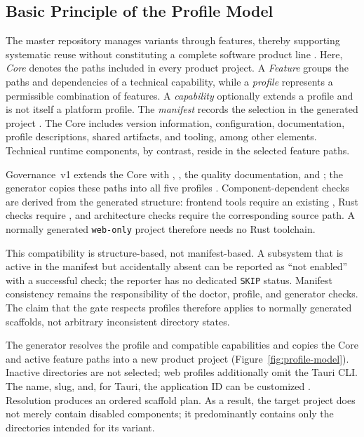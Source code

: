 \subsection{Basic Principle of the Profile Model}
\label{subsec:grundprinzip-profilmodell}

The master repository manages variants through features, thereby supporting
systematic reuse without constituting a complete software product line
\parencite{clements2001software-product-lines,krueger1992software-reuse}.
Here, \emph{Core} denotes the paths included in every product project. A
\emph{Feature} groups the paths and dependencies of a technical capability,
while a \emph{profile} represents a permissible combination of features. A
\emph{capability} optionally extends a profile and is not itself a platform
profile. The \emph{manifest} records the selection in the generated project
\parencite{kleiveist2026profiles,kleiveist2026governance-snapshot}.
The Core includes version information, configuration, documentation, profile
descriptions, shared artifacts, and tooling, among other elements. Technical
runtime components, by contrast, reside in the selected feature paths.

Governance~v1 extends the Core with ,
, the quality documentation, and
; the generator copies these paths into all five profiles
\parencite{kleiveist2026quality-policy}. Component-dependent checks are derived
from the generated structure: frontend tools require an existing
, Rust checks require
, and architecture checks require the corresponding
source path. A normally generated \texttt{web-only} project therefore needs no
Rust toolchain.

This compatibility is structure-based, not manifest-based. A subsystem that
is active in the manifest but accidentally absent can be reported as
\enquote{not enabled} with a successful check; the reporter has no dedicated
\texttt{SKIP} status. Manifest consistency remains the responsibility of the
doctor, profile, and generator checks. The claim that the gate respects
profiles therefore applies to normally generated scaffolds, not arbitrary
inconsistent directory states.



The generator resolves the profile and compatible capabilities and copies the
Core and active feature paths into a new product project
(Figure~\ref{fig:profile-model}). Inactive directories are not selected; web
profiles additionally omit the Tauri CLI. The name, slug, and, for Tauri, the
application ID can be customized
\parencite{kleiveist2026profiles,kleiveist2026tooling}.
Resolution produces an ordered scaffold plan. As a result, the target project
does not merely contain disabled components; it predominantly contains only
the directories intended for its variant.

